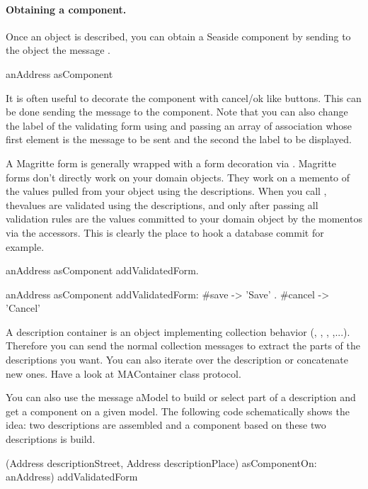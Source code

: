 \documentclass[a4paper,10pt,twoside]{book}
\begin{document}
\paragraph{Obtaining a component.} Once an object is described, you can obtain a Seaside component by sending to the object
the message . 

\begin{code}{}
anAddress asComponent
\end{code}

It is often useful to decorate the component with cancel/ok like buttons. This can be done sending the message  to the component. Note that you can also change the label of the validating form using  and passing an array of association whose first element is the message to be sent and the second the label to be displayed.

A Magritte form is generally wrapped with a form decoration via . Magritte forms don't directly work on your domain objects. They work on a memento of the values pulled from your object using the descriptions. When you call ,  thevalues are validated using the descriptions, and only after passing all validation rules are the values  committed to your domain object by the momentos via the accessors. This is clearly the place to hook 
a database commit for example.

\begin{code}{}
anAddress asComponent addValidatedForm.

anAddress asComponent addValidatedForm: { #save -> 'Save' . #cancel -> 'Cancel'}
\end{code}


A description container is an object implementing collection behavior (, , , ,...). Therefore you can send the normal collection messages to extract the parts of the descriptions you want. You can also iterate over the description or concatenate new ones. Have a look at MAContainer class protocol. 

You can also use the message  aModel to build or select part of a description and get a component
on a given model. The following code schematically shows the idea: two descriptions are assembled and a component
based on these two descriptions is build.

\begin{code}{}
(Address descriptionStreet, Address descriptionPlace) asComponentOn: anAddress)
	addValidatedForm 
\end{code}
\end{document}
